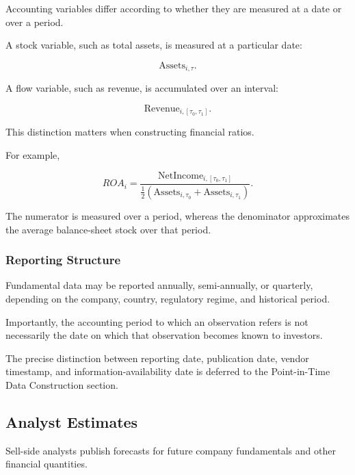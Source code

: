 \documentclass[11pt,a4paper]{article}
\begin{document}
Accounting variables differ according to whether they are measured at a date or
over a period.

A stock variable, such as total assets, is measured at a particular date:

\begin{equation}
\mathrm{Assets}_{i,\tau}.
\end{equation}

A flow variable, such as revenue, is accumulated over an interval:

\begin{equation}
\mathrm{Revenue}_{i,[\tau_0,\tau_1]}.
\end{equation}

This distinction matters when constructing financial ratios.

For example,

\begin{equation}
ROA_i
=
\frac{
\mathrm{NetIncome}_{i,[\tau_0,\tau_1]}
}{
\frac{1}{2}
\left(
\mathrm{Assets}_{i,\tau_0}
+
\mathrm{Assets}_{i,\tau_1}
\right)
}.
\end{equation}

The numerator is measured over a period, whereas the denominator approximates
the average balance-sheet stock over that period.


\subsubsection{Reporting Structure}

Fundamental data may be reported annually, semi-annually, or quarterly,
depending on the company, country, regulatory regime, and historical period.

Importantly, the accounting period to which an observation refers is not
necessarily the date on which that observation becomes known to investors.

The precise distinction between reporting date, publication date, vendor
timestamp, and information-availability date is deferred to the
Point-in-Time Data Construction section.


\subsection{Analyst Estimates}
\label{subsec:analyst_estimates}

Sell-side analysts publish forecasts for future company fundamentals and other
financial quantities.
\end{document}

